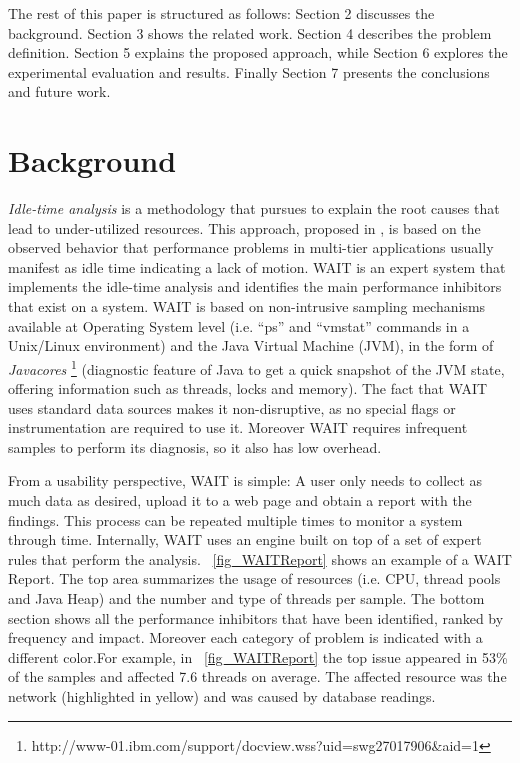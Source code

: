 \documentclass[runningheads,a4paper]{llncs}
\begin{document}
The rest of this paper is structured as follows: Section 2 discusses the
background. Section 3 shows the related work. Section 4 describes the
problem definition. Section 5 explains the proposed approach, while Section 6
explores the experimental evaluation and results. Finally Section 7 presents the
conclusions and future work.

\vspace{-5pt}
\section{Background}
\vspace{-5pt}
\emph{Idle-time analysis} is a methodology that pursues to explain the root
causes that lead to under-utilized resources. This approach, proposed in
\cite{Altman2010}, is based on the observed behavior that performance problems in multi-tier
applications usually manifest as idle time indicating a lack of motion.
WAIT is an expert system that implements the idle-time analysis and identifies
the main performance inhibitors that exist on a system. WAIT is based on non-intrusive
sampling mechanisms available at Operating System level (i.e. ``ps'' and
``vmstat'' commands in a Unix/Linux environment) and the Java Virtual Machine
(JVM), in the form of \emph{Javacores}
\footnote{http://www-01.ibm.com/support/docview.wss?uid=swg27017906\&aid=1}
(diagnostic feature of Java to get a quick snapshot of the JVM state, offering
information such as threads, locks and memory). The fact that WAIT uses standard
data sources makes it non-disruptive, as no special flags or instrumentation are
required to use it. Moreover WAIT requires infrequent samples to perform its
diagnosis, so it also has low overhead.

From a usability perspective, WAIT is simple: A user only needs to collect as
much data as desired, upload it to a web page and obtain a report with the
findings. This process can be repeated multiple times to monitor a system
through time. Internally, WAIT uses an engine built on top of a set of expert
rules that perform the analysis. \figurename ~\ref{fig_WAITReport} shows an
example of a WAIT Report. The top area summarizes the usage of resources (i.e.
CPU, thread pools and Java Heap) and the number and type of threads per sample. 
The bottom section shows all the performance inhibitors that have been identified, ranked
by frequency and impact. Moreover each category of problem is indicated with a
different color.For example, in \figurename ~\ref{fig_WAITReport} the top issue
appeared in 53\% of the samples and affected 7.6 threads on average. The
affected resource was the network (highlighted in yellow) and was caused by
database readings.
\end{document}
